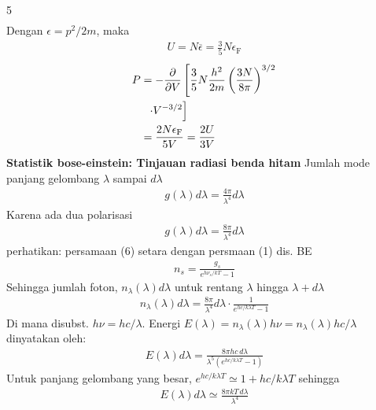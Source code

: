 \documentclass[a4paper  , 6 pt]{article}
\begin{document}
\begin{tiny}
\begin{multicols} {5}
\begin{align}
\end{align}
Dengan  $\epsilon = p^2/2m$, maka
\begin{align}
U = N \overline{\epsilon } = \frac{3}{5} N \epsilon_\mathrm{F}
\end{align}
\begin{align}
P & = - \frac{\partial }{\partial V} \left[ \frac{3}{5} N \frac{h^2}{2m} \left( \frac{3N}{8 \pi }\right)^{3/2} \right. \nonumber \\
& \hspace{0.2 cm } \left. \cdot V^{-3/2}  \right ] \nonumber \\
& = \frac{2 N \epsilon_\mathrm{F}}{5 V} = \frac{2 U}{3 V} \label{pers.keadaan fermi dirac}
\end{align} 
\textbf{Statistik bose-einstein: Tinjauan radiasi benda hitam} 
\newline
Jumlah mode panjang gelombang $\lambda$ sampai $d \lambda$ 
\begin{align}
g(\lambda) d \lambda = \frac{4 \pi}{\lambda^4} d \lambda \label{persamaan gelombang em}
\end{align}
Karena ada dua polarisasi 
\begin{align}
g(\lambda) d \lambda = \frac{8 \pi}{\lambda^4} d \lambda 
\end{align}
perhatikan: persamaan (6) setara dengan persmaan (1)
\newline
dis. BE 
\begin{align}
n_s = \frac{g_s}{e^{h\nu_s /kT} -1}
\end{align}
Sehingga jumlah foton, $n_\lambda (\lambda) d\lambda $ untuk rentang $\lambda $ hingga $\lambda  + d \lambda$ 
\begin{align}
n_\lambda (\lambda) d \lambda = \frac{8 \pi}{\lambda^4} d \lambda \cdot \frac{1}{e^{hc/ k\lambda T} - 1}
\end{align}
Di mana disubst. $h \nu  = h c/ \lambda$.
Energi $E(\lambda) =n_\lambda (\lambda) h \nu = n_\lambda (\lambda) h c/ \lambda  $ dinyatakan oleh:
\begin{align}
E(\lambda) d \lambda = \frac{8 \pi h c \, d\lambda}{\lambda^5 (e^{hc/k \lambda T} - 1)} 
\end{align}
Untuk panjang gelombang yang besar,  $e^{hc /k \lambda T} \simeq 1+ hc/ k\lambda T$ sehingga 
\begin{align}
E(\lambda ) d\lambda  \simeq \frac{8 \pi k T \, d \lambda}{\lambda^4}
\end{align}

\end{multicols}
\end{tiny}
\end{document}
